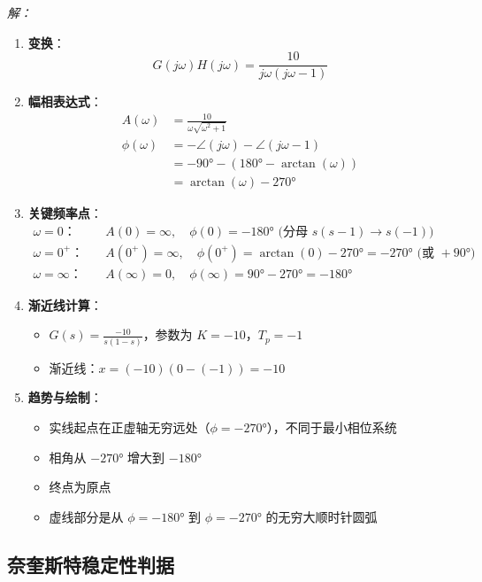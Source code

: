 \textit{解：}
\begin{enumerate}
    \item \textbf{变换}：
    \[G(j\omega)H(j\omega) = \frac{10}{j\omega(j\omega-1)}\]
    
    \item \textbf{幅相表达式}：
    \begin{align*}
    A(\omega) &= \frac{10}{\omega\sqrt{\omega^2+1}} \\
    \phi(\omega) &= -\angle(j\omega) - \angle(j\omega-1) \\
    &= -90° - (180° - \arctan(\omega)) \\
    &= \arctan(\omega) - 270°
    \end{align*}
    
    \item \textbf{关键频率点}：
    \begin{align*}
    \text{$\omega=0$：} \quad & A(0)=\infty, \quad \phi(0)=-180° \text{ (分母 }s(s-1) \to s(-1)\text{)} \\
    \text{$\omega=0^+$：} \quad & A(0^+)=\infty, \quad \phi(0^+)=\arctan(0)-270°=-270° \text{ (或 }+90°\text{)} \\
    \text{$\omega=\infty$：} \quad & A(\infty)=0, \quad \phi(\infty)=90°-270°=-180°
    \end{align*}
    
    \item \textbf{渐近线计算}：
    \begin{itemize}
        \item $G(s)=\frac{-10}{s(1-s)}$，参数为 $K=-10$，$T_p=-1$
        \item 渐近线：$x = (-10)(0-(-1)) = -10$
    \end{itemize}
    
    \item \textbf{趋势与绘制}：
    \begin{itemize}
        \item 实线起点在正虚轴无穷远处（$\phi=-270°$），不同于最小相位系统
        \item 相角从 $-270°$ 增大到 $-180°$
        \item 终点为原点
        \item 虚线部分是从 $\phi=-180°$ 到 $\phi=-270°$ 的无穷大顺时针圆弧
    \end{itemize}
\end{enumerate}

\subsection{奈奎斯特稳定性判据}

